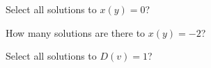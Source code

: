 \documentclass{ximera}
\begin{document}
\begin{exercise}
Select all solutions to $x(y) = 0$?
\begin{selectAll}
\end{selectAll}
\end{exercise}







\begin{exercise}
How many solutions are there to $x(y) = -2$?
\begin{selectAll}
\end{selectAll}
\end{exercise}




\begin{exercise}
Select all solutions to $D(v) = 1$?
\begin{selectAll}
\end{selectAll}
\end{exercise}
\end{document}
